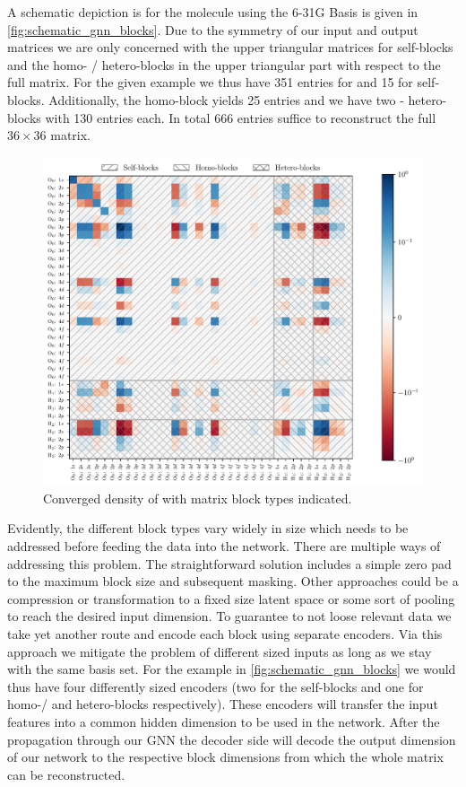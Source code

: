A schematic depiction is for the  molecule using the 6-31G Basis is given in \autoref{fig:schematic_gnn_blocks}. Due to the symmetry of our input and output matrices we are only concerned with the upper triangular matrices for self-blocks and the homo- / hetero-blocks in the upper triangular part with respect to the full matrix. For the given example we thus have 351 entries for  and 15 for  self-blocks. Additionally, the  homo-block yields 25 entries and we have two - hetero-blocks with 130 entries each. In total 666 entries suffice to reconstruct the full $36 \times 36$ matrix. 
\begin{figure}[H]
    \centering
    \includegraphics[width=\textwidth]{../fig/gnn/schematic_blocks.pdf}
    \caption[Matrix block regions of ]{Converged density of  with matrix block types indicated.}
    \label{fig:schematic_gnn_blocks}
\end{figure}
Evidently, the different block types vary widely in size which needs to be addressed before feeding the data into the network. There are multiple ways of addressing this problem. The straightforward solution includes a simple zero pad to the maximum block size and subsequent masking. Other approaches could be a compression or transformation to a fixed size latent space or some sort of pooling to reach the desired input dimension. To guarantee to not loose relevant data we take yet another route and encode each block using separate encoders. Via this approach we mitigate the problem of different sized inputs as long as we stay with the same basis set. For the example in \autoref{fig:schematic_gnn_blocks} we would thus have four differently sized encoders (two for the self-blocks and one for homo-/ and hetero-blocks respectively). These encoders will transfer the input features into a common hidden dimension to be used in the network. After the propagation through our GNN the decoder side will decode the output dimension of our network to the respective block dimensions from which the whole matrix can be reconstructed.
